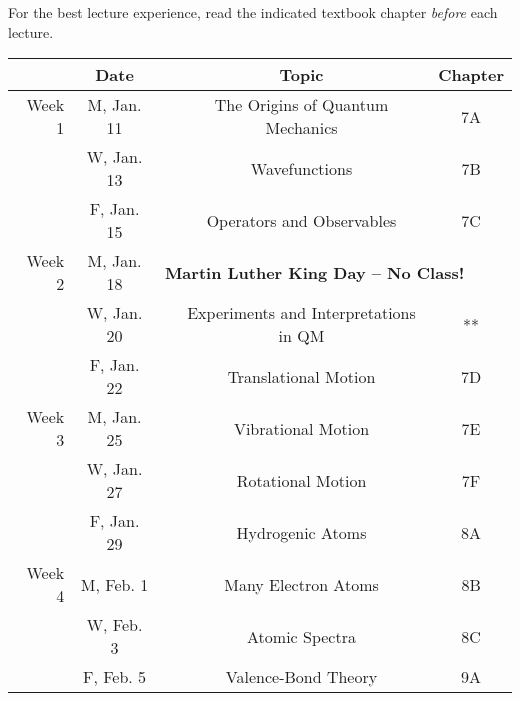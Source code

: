 \documentclass[12pt, letterpaper]{article}
\begin{document}
\noindent For the best lecture experience, read the indicated textbook chapter \emph{before} each lecture.

\noindent
\begin{tabular}{rcccc}
	       & Date       &                                                                  & Topic                                 & Chapter \\
	\midrule
	Week 1 & M, Jan. 11 &                                                                  & The Origins of Quantum Mechanics      & 7A      \\
	       & W, Jan. 13 &                                                                  & Wavefunctions                         & 7B      \\
	       & F, Jan. 15 &                                                                  & Operators and Observables             & 7C      \\
	\midrule
	Week 2 & M, Jan. 18 & \multicolumn{3}{l}{\textbf{Martin Luther King Day -- No Class!}}                                                   \\
	       & W, Jan. 20 &                                                                  & Experiments and Interpretations in QM & **      \\
	       & F, Jan. 22 &                                                                  & Translational Motion                  & 7D      \\
	\midrule
	Week 3 & M, Jan. 25 &                                                                  & Vibrational Motion                    & 7E      \\
	       & W, Jan. 27 &                                                                  & Rotational Motion                     & 7F      \\
	       & F, Jan. 29 &                                                                  & Hydrogenic Atoms                      & 8A      \\
	\midrule
	Week 4 & M, Feb. 1  &                                                                  & Many Electron Atoms                   & 8B      \\
	       & W, Feb. 3  &                                                                  & Atomic Spectra                        & 8C      \\
	       & F, Feb. 5  &                                                                  & Valence-Bond Theory                   & 9A      \\
\end{tabular}
\end{document}
